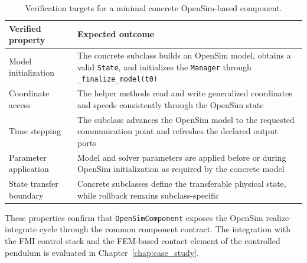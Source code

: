 \begin{table}[t]
  \centering
  \small
  \caption[Verification targets for an OpenSim-based component]{Verification targets for a minimal concrete OpenSim-based component.}
  \label{tab:opensim_verification}
  \begin{tabular}{p{5.8cm} p{8.8cm}}
    \toprule
    \textbf{Verified property} & \textbf{Expected outcome} \\
    \midrule
    Model initialization
      & The concrete subclass builds an OpenSim model, obtains a valid \texttt{State}, and initializes the \texttt{Manager} through \texttt{\_finalize\_model(t0)} \\
    \addlinespace
    Coordinate access
      & The helper methods read and write generalized coordinates and speeds consistently through the OpenSim state \\
    \addlinespace
    Time stepping
      & The subclass advances the OpenSim model to the requested communication point and refreshes the declared output ports \\
    \addlinespace
    Parameter application
      & Model and solver parameters are applied before or during OpenSim initialization as required by the concrete model \\
    \addlinespace
    State transfer boundary
      & Concrete subclasses define the transferable physical state, while rollback remains subclass-specific \\
    \bottomrule
  \end{tabular}
\end{table}

These properties confirm that \texttt{OpenSimComponent} exposes the OpenSim realize--integrate cycle through the common component contract.
The integration with the \ac{FMI} control stack and the \ac{FEM}-based contact element of the controlled pendulum is evaluated in Chapter~\ref{chap:case_study}.
